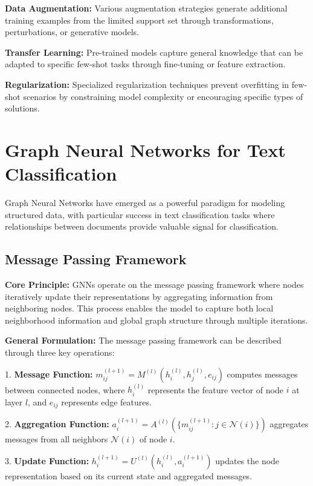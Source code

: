 \textbf{Data Augmentation:} Various augmentation strategies generate additional training examples from the limited support set through transformations, perturbations, or generative models.

\textbf{Transfer Learning:} Pre-trained models capture general knowledge that can be adapted to specific few-shot tasks through fine-tuning or feature extraction.

\textbf{Regularization:} Specialized regularization techniques prevent overfitting in few-shot scenarios by constraining model complexity or encouraging specific types of solutions.

\section{Graph Neural Networks for Text Classification}

Graph Neural Networks have emerged as a powerful paradigm for modeling structured data, with particular success in text classification tasks where relationships between documents provide valuable signal for classification.

\subsection{Message Passing Framework}

\textbf{Core Principle:} GNNs operate on the message passing framework where nodes iteratively update their representations by aggregating information from neighboring nodes. This process enables the model to capture both local neighborhood information and global graph structure through multiple iterations.

\textbf{General Formulation:} The message passing framework can be described through three key operations:

1. \textbf{Message Function:} $m_{ij}^{(l+1)} = M^{(l)}(h_i^{(l)}, h_j^{(l)}, e_{ij})$ computes messages between connected nodes, where $h_i^{(l)}$ represents the feature vector of node $i$ at layer $l$, and $e_{ij}$ represents edge features.

2. \textbf{Aggregation Function:} $a_i^{(l+1)} = A^{(l)}(\{m_{ij}^{(l+1)} : j \in \mathcal{N}(i)\})$ aggregates messages from all neighbors $\mathcal{N}(i)$ of node $i$.

3. \textbf{Update Function:} $h_i^{(l+1)} = U^{(l)}(h_i^{(l)}, a_i^{(l+1)})$ updates the node representation based on its current state and aggregated messages.


